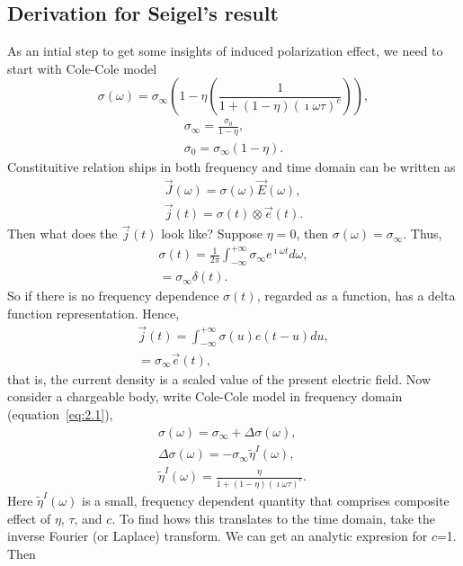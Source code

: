 \documentclass[a4paper, 11pt]{article}
\newcommand {\J}{{\vec J}}
\newcommand {\E}{{\vec E}}
\renewcommand {\j}  { {\vec j} }
\newcommand {\e}  { {\vec e} }
\newcommand{\peta}{\tilde{\eta}}
\begin{document}
\graphicspath{{./IPFigures/}}


\subsection{Derivation for Seigel's result}
As an intial step to get some insights of induced polarization effect, we need to start with Cole-Cole model 
\begin{equation}
\sigma(\omega)=\sigma_{\infty}(1-\eta(\frac{1}{1+(1-\eta)(\imath\omega\tau)^c})), \label{eq:2.1}
\end{equation}
\begin{align}
	\sigma_{\infty} = \frac{\sigma_0}{1-\eta}, \label{eq:2.2}\\
	\sigma_{0} = \sigma_{\infty}(1-\eta). \label{eq:2.3}
\end{align}
Constituitive relation ships in both frequency and time domain can be written as 
\begin{align}
	\J(\omega) = \sigma(\omega)\E(\omega), \label{eq:2.4}\\
	\j(t) = \sigma(t)\otimes \e(t).\label{eq:2.5}
\end{align}
Then what does the $\j(t)$ look like? Suppose $\eta=0$, then $\sigma(\omega) = \sigma_{\infty}$. Thus, 
\begin{align}
	\sigma(t) = \frac{1}{2\pi}\int_{-\infty}^{+\infty}\sigma_{\infty}e^{\imath\omega t} d\omega,\\ \nonumber
			  = \sigma_{\infty}\delta(t).\label{eq:2.6}
\end{align}
So if there is no frequency dependence $\sigma(t)$, regarded as a function, has a delta function representation. Hence, 
\begin{align}
	\j(t) = \int_{-\infty}^{+\infty}\sigma(u)e(t-u) du,\\ \nonumber
	     = \sigma_{\infty}\e(t),\label{eq:2.7}
\end{align}
that is, the current density is a scaled value of the present electric field. Now consider a chargeable body, write Cole-Cole model in frequency domain (equation~\ref{eq:2.1}), 
\begin{align}
	\sigma(\omega) = \sigma_{\infty} + \Delta \sigma(\omega),  \\ \nonumber
	\Delta \sigma(\omega) = -\sigma_{\infty}\peta^{I}(\omega),\\ \nonumber
	\peta^{I}(\omega) = \frac{\eta}{1+(1-\eta)(\imath\omega\tau)^c}. \
\end{align}
Here $\peta^{I}(\omega)$ is a small, frequency dependent quantity that comprises composite effect of $\eta$, $\tau$, and $c$. To find hows this translates to the time domain, take the inverse Fourier (or Laplace) transform. We can get an analytic expresion for $c$=1. Then 
\end{document}

